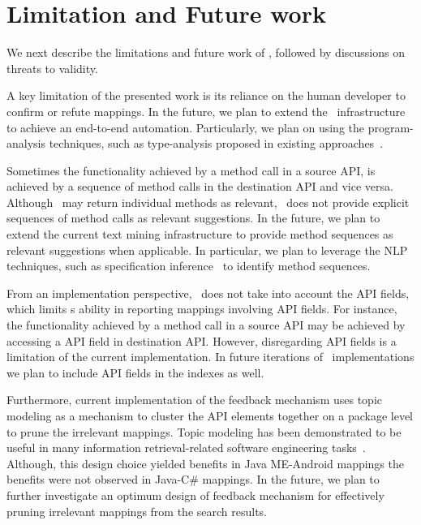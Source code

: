 \section{Limitation and Future work}
\label{sec:discussion}

We next describe the limitations and future work of \tool,
followed by discussions on threats to validity.




A key limitation of the presented work is its reliance on the human developer
to confirm or refute mappings.
In the future, we plan to extend the \tool\ infrastructure to achieve an end-to-end automation. 
Particularly, we plan on using the program-analysis techniques, 
such as type-analysis proposed in
existing approaches~\cite{nguyen2014statistical,zhong09SE}.



Sometimes the functionality achieved by a method call in a source API,
is achieved by a sequence of method calls in the destination API and vice versa.
Although \tool\ may return individual methods as relevant, 
\tool\ does not provide explicit sequences of method calls as relevant suggestions.
In the future, we plan to extend the current text mining infrastructure
to provide method sequences as relevant suggestions when applicable. 
In particular, we plan to leverage the NLP techniques, such as
specification inference~\cite{pandita12:inferring} to identify method sequences. 



From an implementation perspective, \tool\ does not take into account 
the API fields,
which limits \tool s ability in reporting mappings involving API fields.
For instance, the functionality achieved by a method call in a source API
may be achieved by accessing a API field in destination API.
However, disregarding API fields is a limitation of the current implementation.
In future iterations of \tool\ implementations we plan to include API fields in the indexes as well.

Furthermore, current implementation of the feedback mechanism 
uses topic modeling as a mechanism to cluster the API elements together on a package level
to prune the irrelevant mappings. 
Topic modeling has been demonstrated to be useful in many information retrieval-related software engineering tasks~\cite{Panichella2013:ICSE:TopicModel,Binkley:2014:ULS:2597008.2597150}. 
Although, this design choice yielded benefits in Java ME-Android mappings the benefits were not observed in Java-C\# mappings. 
In the future, we plan to further investigate an optimum design of feedback mechanism for effectively pruning irrelevant mappings from the search results. 


